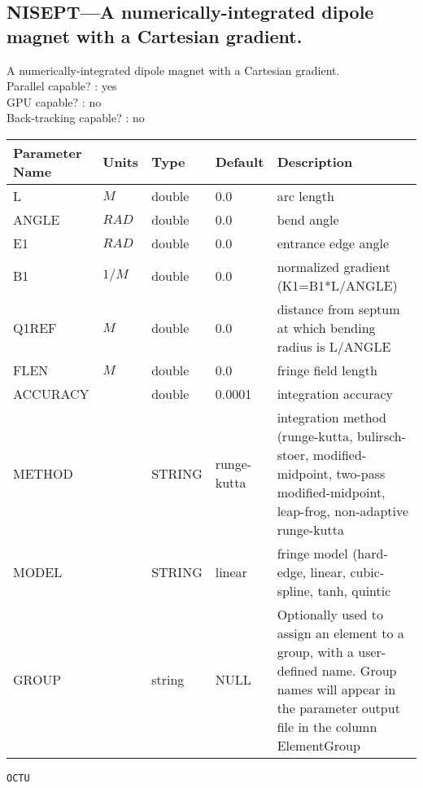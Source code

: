 \subsection{NISEPT---A numerically-integrated dipole magnet with a Cartesian gradient.}
A numerically-integrated dipole magnet with a Cartesian gradient.
\\
Parallel capable? : yes\\
GPU capable? : no\\
Back-tracking capable? : no\\
\begin{tabular}{|l|l|l|l|p{\descwidth}|} \hline
Parameter Name & Units & Type & Default & Description \\ \hline 
L & $M$ & double &  0.0 & arc length  \\ \hline 
ANGLE & $RAD$ & double &  0.0 & bend angle  \\ \hline 
E1 & $RAD$ & double &  0.0 & entrance edge angle  \\ \hline 
B1 & $1/M$ & double &  0.0 & normalized gradient (K1=B1*L/ANGLE)  \\ \hline 
Q1REF & $M$ & double &  0.0 & distance from septum at which bending radius is L/ANGLE  \\ \hline 
FLEN & $M$ & double &  0.0 & fringe field length  \\ \hline 
ACCURACY &  & double &   0.0001 & integration accuracy  \\ \hline 
METHOD &  & STRING &   runge-kutta     & integration method (runge-kutta, bulirsch-stoer, modified-midpoint, two-pass modified-midpoint, leap-frog, non-adaptive runge-kutta  \\ \hline 
MODEL &  & STRING &   linear          & fringe model (hard-edge, linear, cubic-spline, tanh, quintic  \\ \hline 
GROUP &  & string & NULL & Optionally used to assign an element to a group, with a user-defined name.  Group names will appear in the parameter output file in the column ElementGroup  \\ \hline 
\end{tabular}

\newpage
\begin{center}{\Large\verb|OCTU|}\end{center}
